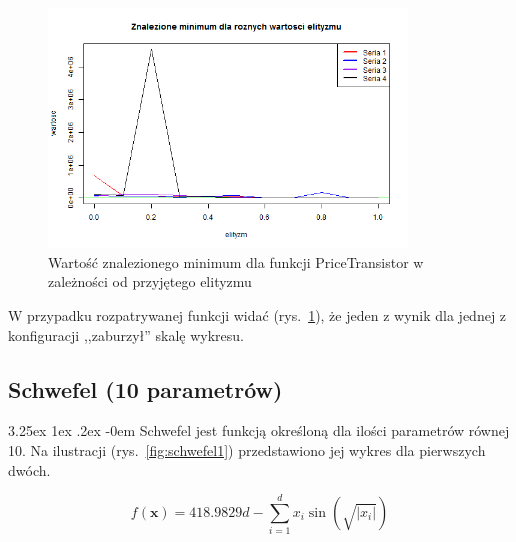 \documentclass[11pt, a4paper]{article}
\makeatletter
\newcommand{\fbi}{\leavevmode{\parindent=1em\indent}}
\renewcommand\paragraph{\@startsection{paragraph}{5}{\z@}
  {3.25ex \@plus1ex \@minus.2ex}
  {-0em}
  {\normalfont\normalsize\bfseries}}
\makeatother
\begin{document}
\begin{figure}[H]
	\begin{center}
		\includegraphics[width=0.85\textwidth]{./assets/PriceTransistor6.png}
		\caption{Wartość znalezionego minimum dla funkcji PriceTransistor w zależności od przyjętego elityzmu}
		\label{fig:pricetransistor6}
	\end{center}
\end{figure}

\fbi
W przypadku rozpatrywanej funkcji widać (rys.~\ref{fig:pricetransistor6}), że jeden z wynik dla jednej z konfiguracji ,,zaburzył'' skalę wykresu.

\newpage
\subsection{Schwefel (10 parametrów)}
\paragraph{}
Schwefel jest funkcją określoną dla ilości parametrów równej 10. Na ilustracji (rys.~\ref{fig:schwefel1}) przedstawiono jej wykres dla pierwszych dwóch.

\begin{equation}\label{eq:schwefel}
f(\boldsymbol{x}) = 418.9829d - \sum_{i=1}^{d} x_i \sin(\sqrt{|x_i|})
\end{equation}
\end{document}
